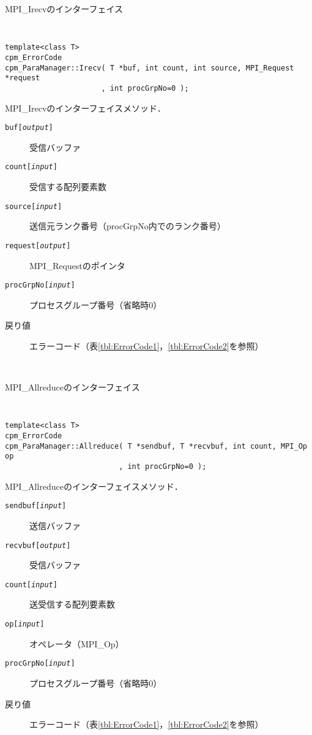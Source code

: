 \begin{spacing}{0.8}
\begin{itembox}[l]{MPI\_Irecvのインターフェイス}
{\tt
\begin{verbatim}
template<class T>
cpm_ErrorCode
cpm_ParaManager::Irecv( T *buf, int count, int source, MPI_Request *request
                      , int procGrpNo=0 );
\end{verbatim}
}
MPI\_Irecvのインターフェイスメソッド．
\begin{description}
\item[{\tt buf[{\it output}]}] 受信バッファ
\item[{\tt count[{\it input}]}] 受信する配列要素数
\item[{\tt source[{\it input}]}] 送信元ランク番号（procGrpNo内でのランク番号）
\item[{\tt request[{\it output}]}] MPI\_Requestのポインタ
\item[{\tt procGrpNo[{\it input}]}] プロセスグループ番号（省略時0）
\\
\item[戻り値] エラーコード（表\ref{tbl:ErrorCode1}，\ref{tbl:ErrorCode2}を参照）
\end{description}
\end{itembox}\\
\end{spacing}

\begin{spacing}{0.8}
\begin{itembox}[l]{MPI\_Allreduceのインターフェイス}
{\tt
\begin{verbatim}
template<class T>
cpm_ErrorCode
cpm_ParaManager::Allreduce( T *sendbuf, T *recvbuf, int count, MPI_Op op
                          , int procGrpNo=0 );
\end{verbatim}
}
MPI\_Allreduceのインターフェイスメソッド．
\begin{description}
\item[{\tt sendbuf[{\it input}]}] 送信バッファ
\item[{\tt recvbuf[{\it output}]}] 受信バッファ
\item[{\tt count[{\it input}]}] 送受信する配列要素数
\item[{\tt op[{\it input}]}] オペレータ（MPI\_Op）
\item[{\tt procGrpNo[{\it input}]}] プロセスグループ番号（省略時0）
\\
\item[戻り値] エラーコード（表\ref{tbl:ErrorCode1}，\ref{tbl:ErrorCode2}を参照）
\end{description}
\end{itembox}\\
\end{spacing}

